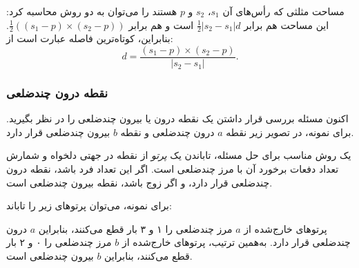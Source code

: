 مساحت مثلثی که رأس‌های آن
$s_1$، $s_2$ و $p$ هستند را می‌توان به دو روش محاسبه کرد:
این مساحت هم برابر $\frac{1}{2} |s_2-s_1| d$ است
و هم برابر $\frac{1}{2} ((s_1-p) \times (s_2-p))$.
بنابراین، کوتاه‌ترین فاصله عبارت است از:
\[ d = \frac{(s_1-p) \times (s_2-p)}{|s_2-s_1|} .\]

\subsubsection{نقطه درون چندضلعی}

اکنون مسئله بررسی قرار داشتن یک نقطه درون یا بیرون چندضلعی را در نظر بگیرید.
برای نمونه، در تصویر زیر نقطه $a$ درون چندضلعی و نقطه $b$ بیرون چندضلعی قرار دارد.

\begin{center}
\end{center}

یک روش مناسب برای حل مسئله،
تاباندن یک \emph{پرتو} از نقطه در جهتی دلخواه
و شمارش تعداد دفعات برخورد آن با مرز چندضلعی است.
اگر این تعداد فرد باشد،
نقطه درون چندضلعی قرار دارد،
و اگر زوج باشد،
نقطه بیرون چندضلعی است.

\begin{samepage}
برای نمونه، می‌توان پرتوهای زیر را تاباند:
\begin{center}
\end{center}
\end{samepage}

پرتوهای خارج‌شده از $a$ مرز چندضلعی را ۱ و ۳ بار قطع می‌کنند،
بنابراین $a$ درون چندضلعی قرار دارد.
به‌همین ترتیب، پرتوهای خارج‌شده از $b$ مرز چندضلعی را ۰ و ۲ بار قطع می‌کنند،
بنابراین $b$ بیرون چندضلعی است.

